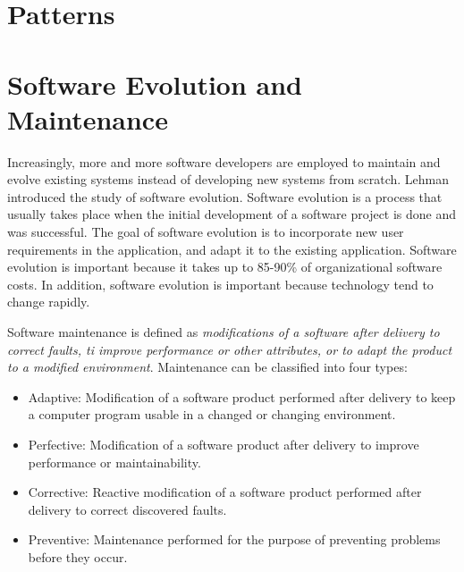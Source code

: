 \section{Patterns}
























\section{Software Evolution and Maintenance}
Increasingly, more and more software developers are employed to maintain and evolve existing systems instead of developing new systems from scratch\cite{Sommerville:2011:SE}. Lehman\cite{lehman1980programs} introduced the study of software evolution. Software evolution is a process that usually takes place when the initial development of a software project is done and was successful\cite{Bennett:2000:SME:336512.336534}. The goal of software evolution is to incorporate new user requirements in the application, and adapt it to the existing application. Software evolution is important because it takes up to 85-90\% of organizational software costs\cite{Sommerville:2011:SE}. In addition, software evolution is important because technology tend to change rapidly.

Software maintenance is defined as \textit{modifications of a software after delivery to correct faults, ti improve performance or other attributes, or to adapt the product to a modified environment}\cite{720567}. Maintenance can be classified into four types\cite{Bennett:2000:SME:336512.336534,720567}:

\begin{itemize}
	\item Adaptive: Modification of a software product performed after delivery to keep a computer program usable in a changed or changing environment.
	\item Perfective: Modification of a software product after delivery to improve performance or maintainability.
	\item Corrective: Reactive modification of a software product performed after delivery to correct discovered faults.
	\item Preventive: Maintenance performed for the purpose of preventing problems before they occur.
\end{itemize}

